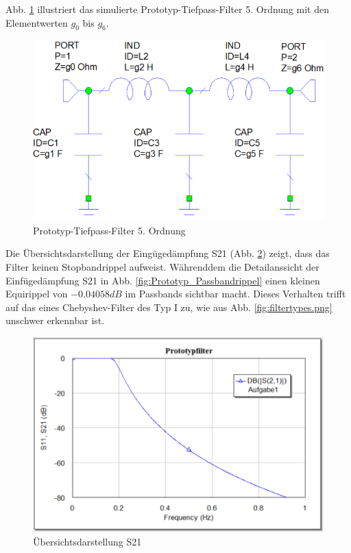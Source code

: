 Abb. \ref{fig:Topologie_Prototyp.png} illustriert das simulierte Prototyp-Tiefpass-Filter 5. Ordnung mit den Elementwerten  $g_0$ bis $g_6$.

\begin{figure}[h!]
\centering
 	\includegraphics[width=\imagewidth]{images/Topologie_Prototyp.png}
 	\caption{Prototyp-Tiefpass-Filter 5. Ordnung}
 	\label{fig:Topologie_Prototyp.png}
\end{figure}

Die Übersichtsdarstellung der Eingügedämpfung S21 (Abb. \ref{fig:Ovw_Prototyp}) zeigt, dass das Filter keinen Stopbandrippel aufweist. Währenddem die Detailanssicht der Einfügedämpfung S21 in Abb. \ref{fig:Prototyp_Passbandrippel} einen kleinen Equirippel von $-0.04058 dB$ im Passbands sichtbar macht. Dieses Verhalten trifft auf das eines Chebyshev-Filter des Typ I zu, wie aus Abb. \ref{fig:filtertypes.png} unschwer erkennbar ist.

\begin{figure}[h!]
\centering
 	\includegraphics[width=\imagewidth]{images/Ovw_Prototyp.png}
 	\caption{Übersichtsdarstellung S21}
 	\label{fig:Ovw_Prototyp}
\end{figure}

